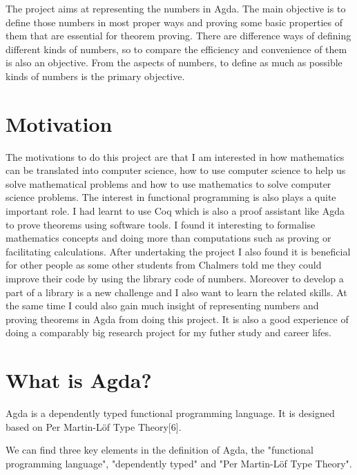 \documentclass{article}
\begin{document}
The project aims at representing the numbers in Agda. The main objective is to define those numbers in most proper ways and proving some basic properties of them that are essential for theorem proving. There are difference ways of defining different kinds of numbers, so to compare the efficiency and convenience of them is also an objective. From the aspects of numbers, to define as much as possible kinds of numbers is the primary objective.


\section{Motivation}

The motivations to do this project are that I am interested in how mathematics can be translated into computer science, how to use computer science to help us solve mathematical problems and how to use mathematics to solve computer science problems. The interest in functional programming is also plays a quite important role. I had learnt to use Coq which is also a proof 	assistant like Agda to prove theorems using software tools. I found it interesting to formalise mathematics concepts and doing more than computations such as proving or facilitating calculations.
After undertaking the project I also found it is beneficial for other people as some other students from Chalmers told me they could improve their code by using the library code of numbers. Moreover to develop a part of a library is a new challenge and I also want to learn the related skills. At the same time I could also gain much insight of representing numbers and proving theorems in Agda from doing this project. It is also a good experience of doing a comparably big research project for my futher study and career lifes.

\section{What is Agda?}

Agda is a dependently typed functional programming language. It is designed based on Per Martin-Löf Type Theory[6].

We can find three key elements in the definition of Agda, the "functional programming language", "dependently typed" and "Per Martin-Löf Type Theory".
\end{document}
